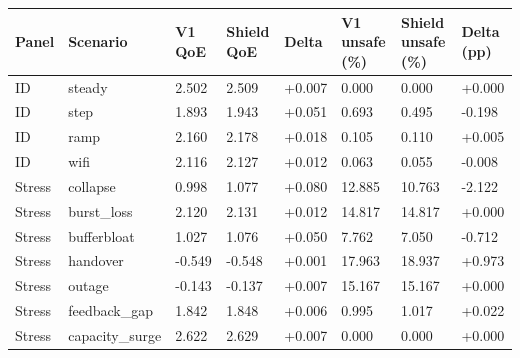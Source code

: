 \begin{tabular}{llllllll}
\toprule
Panel & Scenario & V1 QoE & Shield QoE & Delta & V1 unsafe (\%) & Shield unsafe (\%) & Delta (pp) \\
\midrule
ID & steady & 2.502 & 2.509 & +0.007 & 0.000 & 0.000 & +0.000 \\
ID & step & 1.893 & 1.943 & +0.051 & 0.693 & 0.495 & -0.198 \\
ID & ramp & 2.160 & 2.178 & +0.018 & 0.105 & 0.110 & +0.005 \\
ID & wifi & 2.116 & 2.127 & +0.012 & 0.063 & 0.055 & -0.008 \\
Stress & collapse & 0.998 & 1.077 & +0.080 & 12.885 & 10.763 & -2.122 \\
Stress & burst\_loss & 2.120 & 2.131 & +0.012 & 14.817 & 14.817 & +0.000 \\
Stress & bufferbloat & 1.027 & 1.076 & +0.050 & 7.762 & 7.050 & -0.712 \\
Stress & handover & -0.549 & -0.548 & +0.001 & 17.963 & 18.937 & +0.973 \\
Stress & outage & -0.143 & -0.137 & +0.007 & 15.167 & 15.167 & +0.000 \\
Stress & feedback\_gap & 1.842 & 1.848 & +0.006 & 0.995 & 1.017 & +0.022 \\
Stress & capacity\_surge & 2.622 & 2.629 & +0.007 & 0.000 & 0.000 & +0.000 \\
\bottomrule
\end{tabular}
